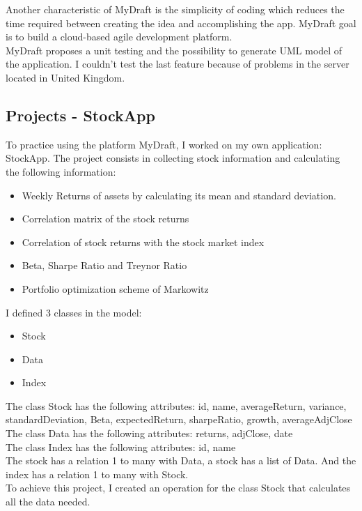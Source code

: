 \documentclass{report}
\begin{document}
Another characteristic of MyDraft is the simplicity of coding which reduces the time required between creating the idea and accomplishing the app. MyDraft goal is to build a cloud-based agile development platform.\\

MyDraft proposes a unit testing and the possibility to generate UML model of the application. I couldn't test the last feature because of problems in the server located in United Kingdom.\\

\subsection{Projects - StockApp}
To practice using the platform MyDraft, I worked on my own application: StockApp. The project consists in collecting stock information and calculating the following information: 
\begin{itemize}
\item Weekly Returns of assets by calculating its mean and standard deviation. 
\item Correlation matrix of the stock returns
\item Correlation of stock returns with the stock market index
\item Beta, Sharpe Ratio and Treynor Ratio
\item Portfolio optimization scheme of Markowitz
\end{itemize}
I defined 3 classes in the model: 
\begin{itemize}
\item Stock
\item Data
\item Index
\end{itemize}
The class Stock has the following attributes: id, name, averageReturn, variance, standardDeviation, Beta, expectedReturn, sharpeRatio, growth, averageAdjClose\\
The class Data has the following attributes: returns, adjClose, date \\
The class Index has the following attributes: id, name\\
The stock has a relation 1 to many with Data, a stock has a list of Data. And the index has a relation 1 to many with Stock. \\
To achieve this project, I created an operation for the class Stock that calculates all the data needed.\\
\end{document}
